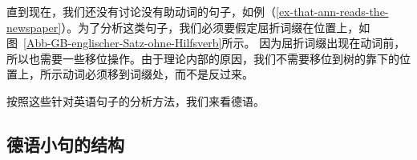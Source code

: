 直到现在，我们还没有讨论没有助动词的句子，如例（\ref{ex-that-ann-reads-the-newspaper}）。为了分析这类句子，我们必须要假定屈折词缀在\inull 位置上，如图~\vref{Abb-GB-englischer-Satz-ohne-Hilfsverb}所示。
因为屈折词缀出现在动词前，所以也需要一些移位操作。由于理论内部的原因，我们不需要移位到树的靠下的位置上，所示动词必须移到词缀处，而不是反过来。
%

按照这些针对英语句子的分析方法，我们来看德语。


\subsection{德语小句的结构}
\label{sec-German-clause}

